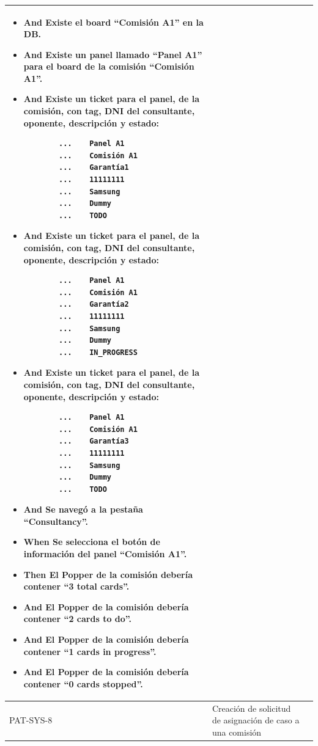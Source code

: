 \begin{longtable}{|p{1cm}|p{2.5cm}|p{12cm}|}
\begin{itemize}
        \item \textbf{And} Existe el board ``Comisión A1'' en la DB.
        \item \textbf{And} Existe un panel llamado ``Panel A1'' para el board de la comisión ``Comisión A1''.
        \item \textbf{And} Existe un ticket para el panel, de la comisión, con tag, DNI del consultante, oponente, descripción y estado:
        \begin{verbatim}
        ...    Panel A1
        ...    Comisión A1
        ...    Garantía1
        ...    11111111
        ...    Samsung
        ...    Dummy
        ...    TODO
            \end{verbatim}
        \item \textbf{And} Existe un ticket para el panel, de la comisión, con tag, DNI del consultante, oponente, descripción y estado:
        \begin{verbatim}
        ...    Panel A1
        ...    Comisión A1
        ...    Garantía2
        ...    11111111
        ...    Samsung
        ...    Dummy
        ...    IN_PROGRESS
            \end{verbatim}
        \item \textbf{And} Existe un ticket para el panel, de la comisión, con tag, DNI del consultante, oponente, descripción y estado:
        \begin{verbatim}
        ...    Panel A1
        ...    Comisión A1
        ...    Garantía3
        ...    11111111
        ...    Samsung
        ...    Dummy
        ...    TODO
            \end{verbatim}
        \item \textbf{And} Se navegó a la pestaña ``Consultancy''.
        \item \textbf{When} Se selecciona el botón de información del panel ``Comisión A1''.
        \item \textbf{Then} El Popper de la comisión debería contener ``3 total cards''.
        \item \textbf{And} El Popper de la comisión debería contener ``2 cards to do''.
        \item \textbf{And} El Popper de la comisión debería contener ``1 cards in progress''.
        \item \textbf{And} El Popper de la comisión debería contener ``0 cards stopped''.
    \end{itemize}
    \\
    \hline
    PAT-SYS-8 & Creación de solicitud de asignación de caso a una comisión &

\end{longtable}
